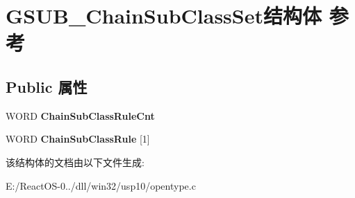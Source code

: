 \hypertarget{struct_g_s_u_b___chain_sub_class_set}{}\section{G\+S\+U\+B\+\_\+\+Chain\+Sub\+Class\+Set结构体 参考}
\label{struct_g_s_u_b___chain_sub_class_set}
\subsection*{Public 属性}
\begin{DoxyCompactItemize}
\item 
\mbox{\label{struct_g_s_u_b___chain_sub_class_set_a9419b27e93ea3f04329d19409536e14a}} 
W\+O\+RD {\bfseries Chain\+Sub\+Class\+Rule\+Cnt}
\item 
\mbox{\label{struct_g_s_u_b___chain_sub_class_set_a23d990e678929f3e450e79311e157b1a}} 
W\+O\+RD {\bfseries Chain\+Sub\+Class\+Rule} \mbox{[}1\mbox{]}
\end{DoxyCompactItemize}


该结构体的文档由以下文件生成\+:\begin{DoxyCompactItemize}
\item 
E\+:/\+React\+O\+S-\/0../dll/win32/usp10/opentype.\+c\end{DoxyCompactItemize}
